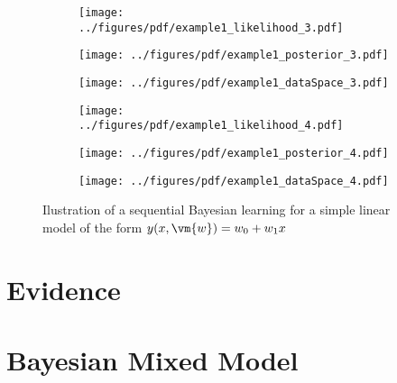 \documentclass[a4paper,10pt]{article}
\begin{document}
\begin{figure}[H]
\begin{subfigure}[c]{0.32\textwidth}
\texttt{[image: ../figures/pdf/example1\_likelihood\_3.pdf]} 
\end{subfigure}
\begin{subfigure}[c]{0.32\textwidth}
\texttt{[image: ../figures/pdf/example1\_posterior\_3.pdf]} 
\end{subfigure}
\begin{subfigure}[c]{0.32\textwidth}
\texttt{[image: ../figures/pdf/example1\_dataSpace\_3.pdf]} 
\end{subfigure}

\begin{subfigure}[c]{0.32\textwidth}
\texttt{[image: ../figures/pdf/example1\_likelihood\_4.pdf]} 
\end{subfigure}
\begin{subfigure}[c]{0.32\textwidth}
\texttt{[image: ../figures/pdf/example1\_posterior\_4.pdf]} 
\end{subfigure}
\begin{subfigure}[c]{0.32\textwidth}
\texttt{[image: ../figures/pdf/example1\_dataSpace\_4.pdf]} 
\end{subfigure}
\caption{Ilustration of a sequential Bayesian learning for a simple linear model of the form $y(x,\vm{w})= w_0 + w_1 x$}
\end{figure}





\section{Evidence}




\section{Bayesian Mixed Model}

\end{document}

